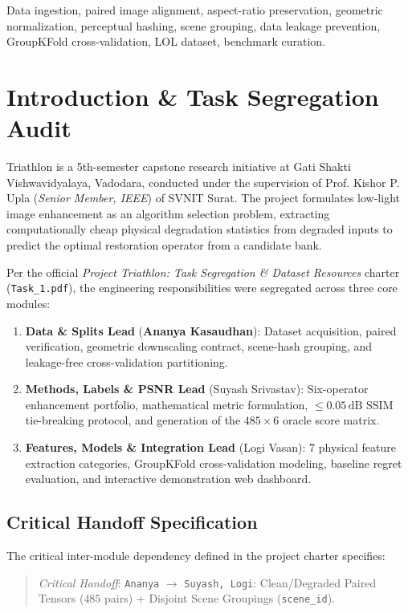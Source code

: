\documentclass[journal]{IEEEtran}
\begin{document}
\begin{IEEEkeywords}
Data ingestion, paired image alignment, aspect-ratio preservation, geometric normalization, perceptual hashing, scene grouping, data leakage prevention, GroupKFold cross-validation, LOL dataset, benchmark curation.
\end{IEEEkeywords}

\section{Introduction \& Task Segregation Audit}
 Triathlon is a 5th-semester capstone research initiative at Gati Shakti Vishwavidyalaya, Vadodara, conducted under the supervision of Prof. Kishor P. Upla (\textit{Senior Member, IEEE}) of SVNIT Surat. The project formulates low-light image enhancement as an algorithm selection problem, extracting computationally cheap physical degradation statistics from degraded inputs to predict the optimal restoration operator from a candidate bank.

Per the official \textit{Project Triathlon: Task Segregation \& Dataset Resources} charter (\texttt{Task\_1.pdf}), the engineering responsibilities were segregated across three core modules:
\begin{enumerate}
    \item \textbf{Data \& Splits Lead} (\textbf{Ananya Kasaudhan}): Dataset acquisition, paired verification, geometric downscaling contract, scene-hash grouping, and leakage-free cross-validation partitioning.
    \item \textbf{Methods, Labels \& PSNR Lead} (Suyash Srivastav): Six-operator enhancement portfolio, mathematical metric formulation, $\le 0.05\,\text{dB}$ SSIM tie-breaking protocol, and generation of the $485 \times 6$ oracle score matrix.
    \item \textbf{Features, Models \& Integration Lead} (Logi Vasan): 7 physical feature extraction categories, GroupKFold cross-validation modeling, baseline regret evaluation, and interactive demonstration web dashboard.
\end{enumerate}

\subsection{Critical Handoff Specification}
The critical inter-module dependency defined in the project charter specifies:
\begin{quote}
\textit{Critical Handoff}: \texttt{Ananya} $\to$ \texttt{Suyash, Logi}: Clean/Degraded Paired Tensors ($485$ pairs) + Disjoint Scene Groupings (\texttt{scene\_id}).
\end{quote}
\end{document}
